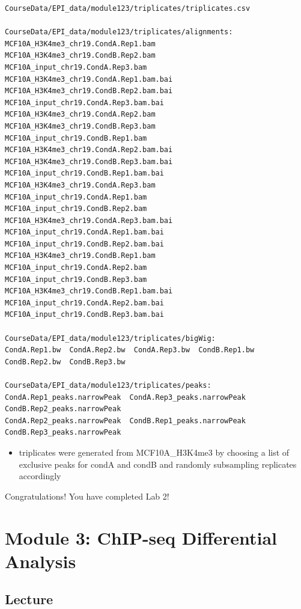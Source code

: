 \documentclass[
]{book}
\providecommand{\tightlist}{%
  \setlength{\itemsep}{0pt}\setlength{\parskip}{0pt}}
\begin{document}
\begin{verbatim}
CourseData/EPI_data/module123/triplicates/triplicates.csv

CourseData/EPI_data/module123/triplicates/alignments:
MCF10A_H3K4me3_chr19.CondA.Rep1.bam      MCF10A_H3K4me3_chr19.CondB.Rep2.bam      MCF10A_input_chr19.CondA.Rep3.bam
MCF10A_H3K4me3_chr19.CondA.Rep1.bam.bai  MCF10A_H3K4me3_chr19.CondB.Rep2.bam.bai  MCF10A_input_chr19.CondA.Rep3.bam.bai
MCF10A_H3K4me3_chr19.CondA.Rep2.bam      MCF10A_H3K4me3_chr19.CondB.Rep3.bam      MCF10A_input_chr19.CondB.Rep1.bam
MCF10A_H3K4me3_chr19.CondA.Rep2.bam.bai  MCF10A_H3K4me3_chr19.CondB.Rep3.bam.bai  MCF10A_input_chr19.CondB.Rep1.bam.bai
MCF10A_H3K4me3_chr19.CondA.Rep3.bam      MCF10A_input_chr19.CondA.Rep1.bam        MCF10A_input_chr19.CondB.Rep2.bam
MCF10A_H3K4me3_chr19.CondA.Rep3.bam.bai  MCF10A_input_chr19.CondA.Rep1.bam.bai    MCF10A_input_chr19.CondB.Rep2.bam.bai
MCF10A_H3K4me3_chr19.CondB.Rep1.bam      MCF10A_input_chr19.CondA.Rep2.bam        MCF10A_input_chr19.CondB.Rep3.bam
MCF10A_H3K4me3_chr19.CondB.Rep1.bam.bai  MCF10A_input_chr19.CondA.Rep2.bam.bai    MCF10A_input_chr19.CondB.Rep3.bam.bai

CourseData/EPI_data/module123/triplicates/bigWig:
CondA.Rep1.bw  CondA.Rep2.bw  CondA.Rep3.bw  CondB.Rep1.bw  CondB.Rep2.bw  CondB.Rep3.bw

CourseData/EPI_data/module123/triplicates/peaks:
CondA.Rep1_peaks.narrowPeak  CondA.Rep3_peaks.narrowPeak  CondB.Rep2_peaks.narrowPeak
CondA.Rep2_peaks.narrowPeak  CondB.Rep1_peaks.narrowPeak  CondB.Rep3_peaks.narrowPeak
\end{verbatim}

\begin{itemize}
\tightlist
\item
  triplicates were generated from MCF10A\_H3K4me3 by choosing a list of exclusive peaks for condA and condB and randomly subsampling replicates accordingly
\end{itemize}

Congratulations! You have completed Lab 2!

\chapter{Module 3: ChIP-seq Differential Analysis}\label{module-3-chip-seq-differential-analysis}

\section{Lecture}\label{lecture-2}
\end{document}
